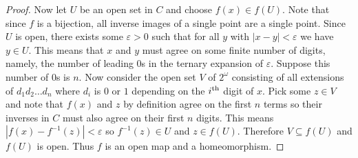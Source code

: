 \documentclass{article}
\begin{document}
\begin{proof}
Now let $U$ be an open set in $C$ and choose $f(x) \in f(U)$. Note that since $f$ is a bijection, all inverse images of a single point are a single point. Since $U$ is open, there exists some $\varepsilon > 0$ such that for all $y$ with $|x-y| < \varepsilon$ we have $y \in U$. This means that $x$ and $y$ must agree on some finite number of digits, namely, the number of leading $0$s in the ternary expansion of $\varepsilon$. Suppose this number of $0$s is $n$. Now consider the open set $V$ of $2^{\omega}$ consisting of all extensions of $d_1d_2 \dots d_n$ where $d_i$ is $0$ or $1$ depending on the $i^{\textup{th}}$ digit of $x$. Pick some $z \in V$ and note that $f(x)$ and $z$ by definition agree on the first $n$ terms so their inverses in $C$ must also agree on their first $n$ digits. This means $|f(x) - f^{-1}(z)| < \varepsilon$ so $f^{-1}(z) \in U$ and $z \in f(U)$. Therefore $V \subseteq f(U)$ and $f(U)$ is open. Thus $f$ is an open map and a homeomorphism.
\end{proof}
\end{document}
